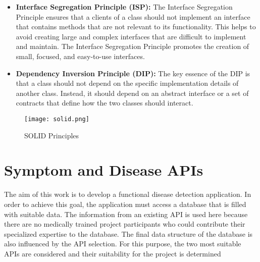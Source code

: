 \begin{itemize}
	\item \textbf{Interface Segregation Principle (ISP):}
	The Interface Segregation Principle ensures that a clients of a class should not implement an interface that contains methods that are not relevant to its functionality. This helps to avoid creating large and complex interfaces that are difficult to implement and maintain. The Interface Segregation Principle promotes the creation of small, focused, and easy-to-use interfaces. 
	
	\item \textbf{Dependency Inversion Principle (DIP):}
	The key essence of the DIP is that a class should not depend on the specific implementation details of another class. Instead, it should depend on an abstract interface or a set of contracts that define how the two classes should interact.
\end{itemize}

\begin{figure}[H]
	\centering
	\texttt{[image: solid.png]}
	\caption[SOLID]{SOLID Principles}
\end{figure}
\section{Symptom and Disease APIs}

The aim of this work is to develop a functional disease detection application. In order to achieve this goal, the application must access a database that is filled with suitable data. The information from an existing API is used here because there are no medically trained project participants who could contribute their specialized expertise to the database. The final data structure of the database is also influenced by the API selection. For this purpose, the two most suitable APIs are considered and their suitability for the project is determined
